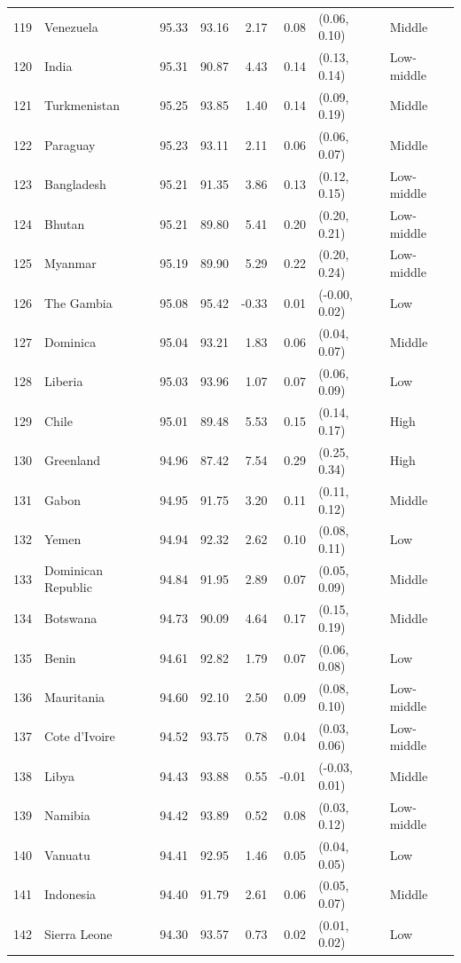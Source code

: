 \begin{longtable}{r l r r r r l l}
119 & Venezuela & 95.33 & 93.16 & 2.17 & 0.08 & (0.06, 0.10) & Middle \\
120 & India & 95.31 & 90.87 & 4.43 & 0.14 & (0.13, 0.14) & Low-middle \\
121 & Turkmenistan & 95.25 & 93.85 & 1.40 & 0.14 & (0.09, 0.19) & Middle \\
122 & Paraguay & 95.23 & 93.11 & 2.11 & 0.06 & (0.06, 0.07) & Middle \\
123 & Bangladesh & 95.21 & 91.35 & 3.86 & 0.13 & (0.12, 0.15) & Low-middle \\
124 & Bhutan & 95.21 & 89.80 & 5.41 & 0.20 & (0.20, 0.21) & Low-middle \\
125 & Myanmar & 95.19 & 89.90 & 5.29 & 0.22 & (0.20, 0.24) & Low-middle \\
126 & The Gambia & 95.08 & 95.42 & -0.33 & 0.01 & (-0.00, 0.02) & Low \\
127 & Dominica & 95.04 & 93.21 & 1.83 & 0.06 & (0.04, 0.07) & Middle \\
128 & Liberia & 95.03 & 93.96 & 1.07 & 0.07 & (0.06, 0.09) & Low \\
129 & Chile & 95.01 & 89.48 & 5.53 & 0.15 & (0.14, 0.17) & High \\
130 & Greenland & 94.96 & 87.42 & 7.54 & 0.29 & (0.25, 0.34) & High \\
131 & Gabon & 94.95 & 91.75 & 3.20 & 0.11 & (0.11, 0.12) & Middle \\
132 & Yemen & 94.94 & 92.32 & 2.62 & 0.10 & (0.08, 0.11) & Low \\
133 & Dominican Republic & 94.84 & 91.95 & 2.89 & 0.07 & (0.05, 0.09) & Middle \\
134 & Botswana & 94.73 & 90.09 & 4.64 & 0.17 & (0.15, 0.19) & Middle \\
135 & Benin & 94.61 & 92.82 & 1.79 & 0.07 & (0.06, 0.08) & Low \\
136 & Mauritania & 94.60 & 92.10 & 2.50 & 0.09 & (0.08, 0.10) & Low-middle \\
137 & Cote d'Ivoire & 94.52 & 93.75 & 0.78 & 0.04 & (0.03, 0.06) & Low-middle \\
138 & Libya & 94.43 & 93.88 & 0.55 & -0.01 & (-0.03, 0.01) & Middle \\
139 & Namibia & 94.42 & 93.89 & 0.52 & 0.08 & (0.03, 0.12) & Low-middle \\
140 & Vanuatu & 94.41 & 92.95 & 1.46 & 0.05 & (0.04, 0.05) & Low \\
141 & Indonesia & 94.40 & 91.79 & 2.61 & 0.06 & (0.05, 0.07) & Middle \\
142 & Sierra Leone & 94.30 & 93.57 & 0.73 & 0.02 & (0.01, 0.02) & Low \\

\end{longtable}

